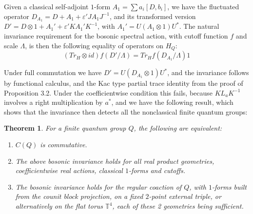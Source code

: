 \documentclass[11pt]{amsart}
\newtheorem{theorem}{Theorem}[section]
\theoremstyle{definition}
\begin{document}
Given a classical self-adjoint $1$-form $A_1=\sum a_i[D,b_i]$, we have the fluctuated operator $D_{A_1}=D+A_1+\varepsilon'JA_1J^{-1}$, and its transformed version $D'=D\otimes1+A_1'+\varepsilon'KA_1'K^{-1}$, with $A_1'=U(A_1\otimes1)U^*$. The natural invariance requirement for the bosonic spectral action, with cutoff function $f$ and scale $\Lambda$, is then the following equality of operators on $H_Q$:
$$(Tr_H\otimes id)f(D'/\Lambda)=Tr_Hf(D_{A_1}/\Lambda)1$$

Under full commutation we have $D'=U(D_{A_1}\otimes1)U^*$, and the invariance follows by functional calculus, and the Kac type partial trace identity from the proof of Proposition 3.2. Under the coefficientwise condition this fails, because $KL_aK^{-1}$ involves a right multiplication by $a^*$, and we have the following result, which shows that the invariance then detects all the nonclassical finite quantum groups:

\begin{theorem}
For a finite quantum group $Q$, the following are equivalent:
\begin{enumerate}
\item $C(Q)$ is commutative.

\item The above bosonic invariance holds for all real product geometries, coefficientwise real actions, classical $1$-forms and cutoffs.

\item The bosonic invariance holds for the regular coaction of $Q$, with $1$-forms built from the counit block projection, on a fixed $2$-point external triple, or alternatively on the flat torus $\mathbb T^4$, each of these 2 geometries being sufficient.
\end{enumerate}
\end{theorem}
\end{document}
